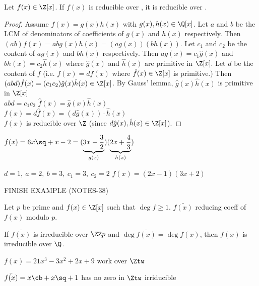 \documentclass[a4paper]{article}
\begin{document}
\begin{theorem}
  Let \( f(x)\in\Z[x] \). If \( f(x) \) is reducible over \Q, it is reducible over \Z.
\end{theorem}

\begin{proof}
  Assume \( f(x)=g(x)h(x) \) with \( g(x),h(x)\in\Q[x] \).
  Let \( a \) and \( b \) be the LCM of denominators of coefficients of \( g(x) \) and \( h(x) \) respectively.
  Then \( (ab)f(x) = abg(x)h(x) = (ag(x))(bh(x)) \).
  Let \( c_1 \) and \( c_2 \) be the content of \( ag(x) \) and \( bh(x) \) respectively.
  Then \( ag(x) = c_1\hat g(x) \) and \( bh(x) = c_2\hat h(x) \) where \( \hat g(x) \) and \( \hat h(x) \) are primitive in \( \Z[x] \).
  Let \( d \) be the content of \( f \) (i.e. \( f(x) = d\hat f(x) \) where \( \hat f(x) \in \Z[x]\) is primitive.)
  Then \( (abd)\hat f(x) = (c_1c_2)\hat g(x)\hat h(x) \in \Z[x] \).
  By Gauss' lemma, \( \hat g(x) \hat h(x) \) is primitive in \( \Z[x] \)\\
  \imp \( abd = c_1c_2 \) \imp \( \hat f(x) = \hat g(x)\hat h(x) \) \\
  \imp \( f(x) = d\hat f(x) = (d\hat g(x))\cdot\hat h(x) \) \\
  \imp \( f(x) \) is reducible over \( \Z \) (since \( d\hat g(x),\hat h(x)\in \Z[x] \)).
\end{proof}

\begin{example}
  \( f(x) = 6x\sq + x - 2 = (\underbrace{3x-\frac{3}{2}}_{g(x)})(\underbrace{2x+\frac{4}{3}}_{h(x)}) \)

  \( d=1,\ a=2,\ b=3,\ c_1=3,\ c_2=2 \) \imp \( f(x) = (2x-1)(3x+2) \)

  FINISH EXAMPLE (NOTES-38)
\end{example}

\begin{theorem}
  Let \( p \) be prime and \( f(x)\in\Z[x] \) such that \( \deg f \geq 1 \).
  \( \bar{f(x)} \) reducing coeff of \( f(x) \) modulo \( p \).

  If \( \bar{f(x)} \) is irreducible over \( \ZZ p \) and \( \deg \bar{f(x)} = \deg f(x) \), then \( f(x) \) is irreducible over \( \Q \).
\end{theorem}

\begin{remark}
  \( f(x) = 21x^3-3x^2+2x+9 \) work over \( \Ztw \)

  \( \bar{f(x)} = x\cb+x\sq+1 \) has no zero in \( \Ztw \) \imp irriducible
\end{remark}
\end{document}
